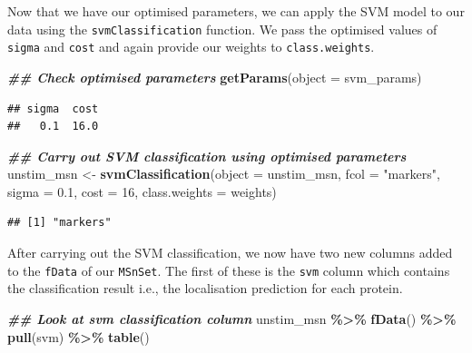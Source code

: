 \documentclass[9pt,a4paper,]{extarticle}
\newenvironment{Shaded}{\begin{snugshade}}{\end{snugshade}}
\newcommand{\AttributeTok}[1]{\textcolor[rgb]{0.13,0.29,0.53}{#1}}
\newcommand{\DecValTok}[1]{\textcolor[rgb]{0.00,0.00,0.81}{#1}}
\newcommand{\DocumentationTok}[1]{\textcolor[rgb]{0.56,0.35,0.01}{\textbf{\textit{#1}}}}
\newcommand{\FloatTok}[1]{\textcolor[rgb]{0.00,0.00,0.81}{#1}}
\newcommand{\FunctionTok}[1]{\textcolor[rgb]{0.13,0.29,0.53}{\textbf{#1}}}
\newcommand{\NormalTok}[1]{#1}
\newcommand{\OtherTok}[1]{\textcolor[rgb]{0.56,0.35,0.01}{#1}}
\newcommand{\SpecialCharTok}[1]{\textcolor[rgb]{0.81,0.36,0.00}{\textbf{#1}}}
\newcommand{\StringTok}[1]{\textcolor[rgb]{0.31,0.60,0.02}{#1}}
\begin{document}
Now that we have our optimised parameters, we can apply the SVM model to our
data using the \texttt{svmClassification} function. We pass the optimised values of
\texttt{sigma} and \texttt{cost} and again provide our weights to \texttt{class.weights}.

\begin{Shaded}
\begin{Highlighting}[]
\DocumentationTok{\#\# Check optimised parameters}
\FunctionTok{getParams}\NormalTok{(}\AttributeTok{object =}\NormalTok{ svm\_params)}
\end{Highlighting}
\end{Shaded}

\begin{verbatim}
## sigma  cost 
##   0.1  16.0
\end{verbatim}

\begin{Shaded}
\begin{Highlighting}[]
\DocumentationTok{\#\# Carry out SVM classification using optimised parameters}
\NormalTok{unstim\_msn }\OtherTok{\textless{}{-}} \FunctionTok{svmClassification}\NormalTok{(}\AttributeTok{object =}\NormalTok{ unstim\_msn, }
                                \AttributeTok{fcol =} \StringTok{"markers"}\NormalTok{,}
                                \AttributeTok{sigma =} \FloatTok{0.1}\NormalTok{,}
                                \AttributeTok{cost =} \DecValTok{16}\NormalTok{, }
                                \AttributeTok{class.weights =}\NormalTok{ weights)}
\end{Highlighting}
\end{Shaded}

\begin{verbatim}
## [1] "markers"
\end{verbatim}

After carrying out the SVM classification, we now have two new columns added to
the \texttt{fData} of our \texttt{MSnSet}. The first of these is the \texttt{svm} column which contains
the classification result i.e., the localisation prediction for each protein.

\begin{Shaded}
\begin{Highlighting}[]
\DocumentationTok{\#\# Look at svm classification column}
\NormalTok{unstim\_msn }\SpecialCharTok{\%\textgreater{}\%}
  \FunctionTok{fData}\NormalTok{() }\SpecialCharTok{\%\textgreater{}\%}
  \FunctionTok{pull}\NormalTok{(svm) }\SpecialCharTok{\%\textgreater{}\%}
  \FunctionTok{table}\NormalTok{()}
\end{Highlighting}
\end{Shaded}
\end{document}

